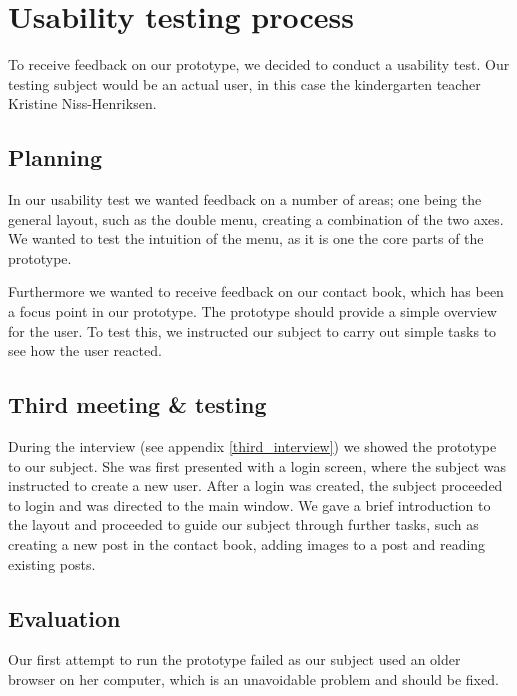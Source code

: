 \section{Usability testing process}
To receive feedback on our prototype, we decided to conduct a usability test. Our testing subject would be an actual user, in this case the kindergarten teacher Kristine Niss-Henriksen.
\subsection{Planning}

In our usability test we wanted feedback on a number of areas; one being the general layout, such as the double menu, creating a combination of the two axes. We wanted to test the intuition of the menu, as it is one the core parts of the prototype. 
 
Furthermore we wanted to receive feedback on our contact book, which has been a focus point in our prototype. The prototype should provide a simple overview for the user. To test this, we instructed our subject to carry out simple tasks to see how the user reacted.


\subsection{Third meeting \& testing}

During the interview (see appendix \vref{third_interview}) we showed the prototype to our subject. She was first presented with a login screen, where the subject was instructed to create a new user. After a login was created, the subject proceeded to login and was directed to the main window. We gave a brief introduction to the layout and proceeded to guide our subject through further tasks, such as creating a new post in the contact book, adding images to a post and reading existing posts. 


\subsection{Evaluation}
Our first attempt to run the prototype failed as our subject used an older browser on her computer, which is an unavoidable problem and should be fixed.

